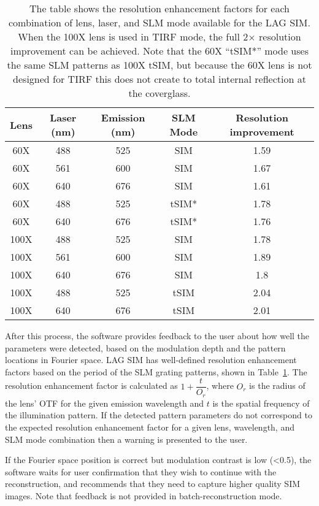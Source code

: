 \begin{table}[h!]
\caption[LAG SIM: Resolution improvement for different lenses, wavelengths, and SLM grating patterns]{\label{tab:resolution}The table shows the resolution enhancement factors for each combination of lens, laser, and SLM mode available for the LAG SIM. When the 100X lens is used in TIRF mode, the full 2$\times$ resolution improvement can be achieved. Note that the 60X ``tSIM*'' mode uses the same SLM patterns as 100X tSIM, but because the 60X lens is not designed for TIRF this does not create to total internal reflection at the coverglass. } 
\centering
\begin{tabular}{|c|c|c|c|c|}
\hline
Lens &	Laser (nm) &	Emission (nm) & SLM Mode & Resolution improvement \\ \hline
60X &	488 &	525 &	SIM &	1.59 \\
60X &	561 &	600 &	SIM &	1.67 \\
60X &	640 &	676 &	SIM &	1.61 \\
60X &	488 &	525 &	tSIM* &	1.78 \\
60X &	640 &	676 &	tSIM* &	1.76 \\
100X &	488 &	525 &	SIM &	1.78 \\
100X &	561 &	600 &	SIM &	1.89 \\
100X &	640 &	676 &	SIM &	1.8 \\
100X &	488 &	525 &	tSIM &	2.04 \\
100X &	640 &	676 &	tSIM &	2.01 \\ \hline
\end{tabular}
\end{table}

After this process, the software provides feedback to the user about how well the parameters were detected, based on the modulation depth and the pattern locations in Fourier space.
LAG SIM has well-defined resolution enhancement factors based on the period of the SLM grating patterns, shown in Table~\ref{tab:resolution}. 
The resolution enhancement factor is calculated as $1 + \dfrac{t}{O_r}$, where $O_r$ is the radius of the lens' OTF for the given emission wavelength and $t$ is the spatial frequency of the illumination pattern. 
If the detected pattern parameters do not correspond to the expected resolution enhancement factor for a given lens, wavelength, and SLM mode combination then a warning is presented to the user. 
 
If the Fourier space position is correct but modulation contrast is low (<0.5), the software waits for user confirmation that they wish to continue with the reconstruction, and recommends that they need to capture higher quality SIM images. 
Note that feedback is not provided in batch-reconstruction mode. 

